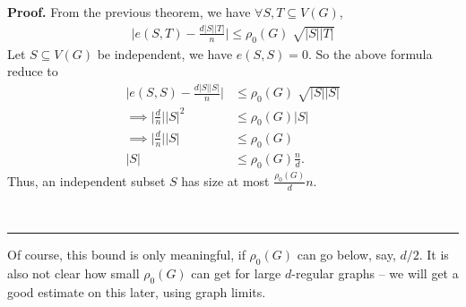 \documentclass[12pt]{article}%
\newenvironment{proof}[1][Proof]{\textbf{#1.} }{\ \rule{0.5em}{0.5em}}
\begin{document}
\begin{proof}
   From the previous theorem, we have $\forall S,T \subseteq V(G)$,
   \begin{align}
    \lvert e(S,T) - \frac{ d \lvert S \rvert \lvert T \rvert }{ n }\rvert 
    \leq \rho_0 (G) \sqrt[]{\lvert S \rvert \lvert T \rvert}
   \end{align}
   Let $S \subseteq V(G)$ be independent, 
   we have $e(S,S) = 0$.
   So the above formula reduce to 
   \begin{align}
       \lvert e(S,S) - \frac{ d \lvert S \rvert \lvert S \rvert }{ n }\rvert
       &\leq \rho_0 (G) \sqrt[]{\lvert S \rvert \lvert S \rvert}\\
       \implies \lvert \frac{ d }{ n }\rvert \lvert S \rvert^2 &\leq \rho_0 (G) \lvert S \rvert\\
       \implies \lvert \frac{ d }{ n }\rvert \lvert S \rvert &\leq \rho_0 (G) \\
       \lvert S \rvert &\leq \rho_0 (G) \frac{ n }{ d }.
   \end{align}
   Thus, an independent subset $S$ 
   has size at most $\frac{ \rho_0 (G) }{ d }n$.
   
   
\end{proof}


Of course, this bound is only meaningful, if $\rho_{0}(G)$ can go below, say,
$d/2$. It is also not clear how small $\rho_{0}(G)$ can get for large $d
$-regular graphs -- we will get a good estimate on this later, using graph limits.
\end{document}
